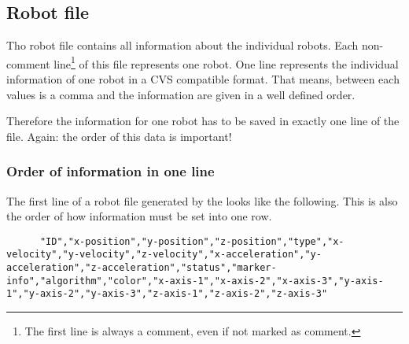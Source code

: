 \subsection{Robot file}
Tho robot file contains all information about the individual robots. Each non-comment line\footnote{The first line is always a comment, even if not marked as comment.} of this file represents one robot. One line represents the individual information of one robot in a CVS compatible format. That means, between each values is a comma and the information are given in a well defined order.

Therefore the information for one robot has to be saved in exactly one line of the file. Again: the order of this data is important!

\subsubsection{Order of information in one line}
The first line of a robot file generated by the \RSS looks like the following. This is also the order of how information must be set into one row.
\begin{lstlisting}
	  "ID","x-position","y-position","z-position","type","x-velocity","y-velocity","z-velocity","x-acceleration","y-acceleration","z-acceleration","status","marker-info","algorithm","color","x-axis-1","x-axis-2","x-axis-3","y-axis-1","y-axis-2","y-axis-3","z-axis-1","z-axis-2","z-axis-3"
\end{lstlisting}


